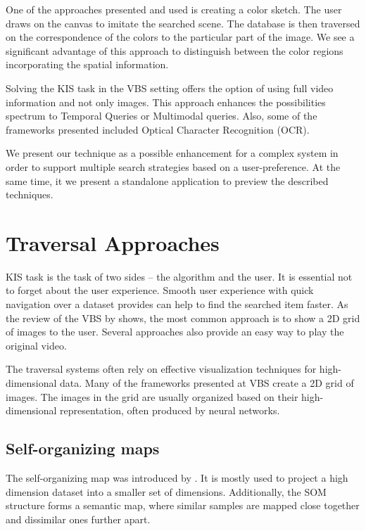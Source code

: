 One of the approaches presented and used is creating a color sketch. The user draws on the canvas to imitate the searched scene. The database is then traversed on the correspondence of the colors to the particular part of the image. We see a significant advantage of this approach to distinguish between the color regions incorporating the spatial information.
 
Solving the KIS task in the VBS setting offers the option of using full video information and not only images. This approach enhances the possibilities spectrum to Temporal Queries or Multimodal queries. Also, some of the frameworks presented included Optical Character Recognition (OCR).

We present our technique as a possible enhancement for a complex system in order to support multiple search strategies based on a user-preference. At the same time, it we present a standalone application to preview the described techniques.

\section{Traversal Approaches}

KIS task is the task of two sides -- the algorithm and the user. It is essential not to forget about the user experience. Smooth user experience with quick navigation over a dataset provides can help to find the searched item faster. As the review of the VBS by \cite{rossetto2020interactive} shows, the most common approach is to show a 2D grid of images to the user. Several approaches also provide an easy way to play the original video. 

The traversal systems often rely on effective visualization techniques for high-dimensional data. Many of the frameworks presented at VBS create a 2D grid of images. The images in the grid are usually organized based on their high-dimensional representation, often produced by neural networks. 

\subsection{Self-organizing maps}

The self-organizing map was introduced by \cite{kohonen1982self}. It is mostly used to project a high dimension dataset into a smaller set of dimensions. Additionally, the SOM structure forms a semantic map, where similar samples are mapped close together and dissimilar ones further apart.

